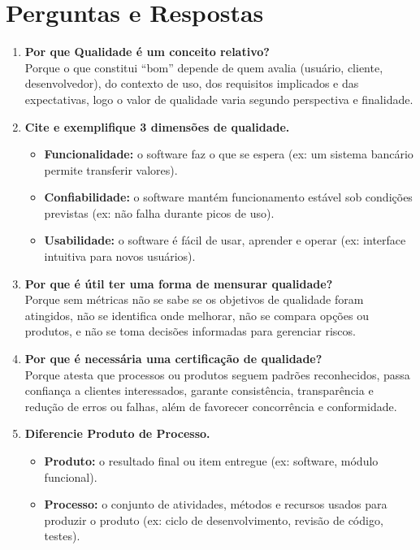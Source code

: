 \documentclass[12pt]{article}
\begin{document}
\section*{Perguntas e Respostas}

\begin{enumerate}[label=\textbf{\arabic*.}]

  \item \textbf{Por que Qualidade é um conceito relativo?} \\
    Porque o que constitui “bom” depende de quem avalia (usuário, cliente, desenvolvedor), do contexto de uso, dos requisitos implicados e das expectativas, logo o valor de qualidade varia segundo perspectiva e finalidade.

  \item \textbf{Cite e exemplifique 3 dimensões de qualidade.} \\
    \begin{itemize}
      \item \textbf{Funcionalidade:} o software faz o que se espera (ex: um sistema bancário permite transferir valores). \\
      \item \textbf{Confiabilidade:} o software mantém funcionamento estável sob condições previstas (ex: não falha durante picos de uso). \\
      \item \textbf{Usabilidade:} o software é fácil de usar, aprender e operar (ex: interface intuitiva para novos usuários).
    \end{itemize}

  \item \textbf{Por que é útil ter uma forma de mensurar qualidade?} \\
    Porque sem métricas não se sabe se os objetivos de qualidade foram atingidos, não se identifica onde melhorar, não se compara opções ou produtos, e não se toma decisões informadas para gerenciar riscos.

  \item \textbf{Por que é necessária uma certificação de qualidade?} \\
    Porque atesta que processos ou produtos seguem padrões reconhecidos, passa confiança a clientes interessados, garante consistência, transparência e redução de erros ou falhas, além de favorecer concorrência e conformidade.

  \item \textbf{Diferencie Produto de Processo.} \\
    \begin{itemize}
      \item \textbf{Produto:} o resultado final ou item entregue (ex: software, módulo funcional). \\
      \item \textbf{Processo:} o conjunto de atividades, métodos e recursos usados para produzir o produto (ex: ciclo de desenvolvimento, revisão de código, testes).
    \end{itemize}


\end{enumerate}
\end{document}
